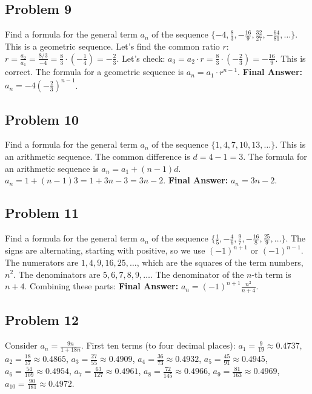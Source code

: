 \documentclass{article}
\begin{document}
\subsection{Problem 9}
Find a formula for the general term $a_n$ of the sequence $\{-4, \frac{8}{3}, -\frac{16}{9}, \frac{32}{27}, -\frac{64}{81}, \dots\}$.
This is a geometric sequence. Let's find the common ratio $r$:
$r = \frac{a_2}{a_1} = \frac{8/3}{-4} = \frac{8}{3} \cdot (-\frac{1}{4}) = -\frac{2}{3}$.
Let's check: $a_3 = a_2 \cdot r = \frac{8}{3} \cdot (-\frac{2}{3}) = -\frac{16}{9}$. This is correct.
The formula for a geometric sequence is $a_n = a_1 \cdot r^{n-1}$.
\textbf{Final Answer:} $a_n = -4 \left(-\frac{2}{3}\right)^{n-1}$.

\subsection{Problem 10}
Find a formula for the general term $a_n$ of the sequence $\{1, 4, 7, 10, 13, \dots\}$.
This is an arithmetic sequence. The common difference is $d = 4-1 = 3$.
The formula for an arithmetic sequence is $a_n = a_1 + (n-1)d$.
$a_n = 1 + (n-1)3 = 1 + 3n - 3 = 3n - 2$.
\textbf{Final Answer:} $a_n = 3n - 2$.

\subsection{Problem 11}
Find a formula for the general term $a_n$ of the sequence $\{\frac{1}{5}, -\frac{4}{6}, \frac{9}{7}, -\frac{16}{8}, \frac{25}{9}, \dots\}$.
The signs are alternating, starting with positive, so we use $(-1)^{n+1}$ or $(-1)^{n-1}$.
The numerators are $1, 4, 9, 16, 25, \dots$, which are the squares of the term numbers, $n^2$.
The denominators are $5, 6, 7, 8, 9, \dots$. The denominator of the $n$-th term is $n+4$.
Combining these parts:
\textbf{Final Answer:} $a_n = (-1)^{n+1} \frac{n^2}{n+4}$.

\subsection{Problem 12}
Consider $a_n = \frac{9n}{1+18n}$.
First ten terms (to four decimal places):
$a_1 = \frac{9}{19} \approx 0.4737$, $a_2 = \frac{18}{37} \approx 0.4865$, $a_3 = \frac{27}{55} \approx 0.4909$, $a_4 = \frac{36}{73} \approx 0.4932$, $a_5 = \frac{45}{91} \approx 0.4945$, $a_6 = \frac{54}{109} \approx 0.4954$, $a_7 = \frac{63}{127} \approx 0.4961$, $a_8 = \frac{72}{145} \approx 0.4966$, $a_9 = \frac{81}{163} \approx 0.4969$, $a_{10} = \frac{90}{181} \approx 0.4972$.
\end{document}
